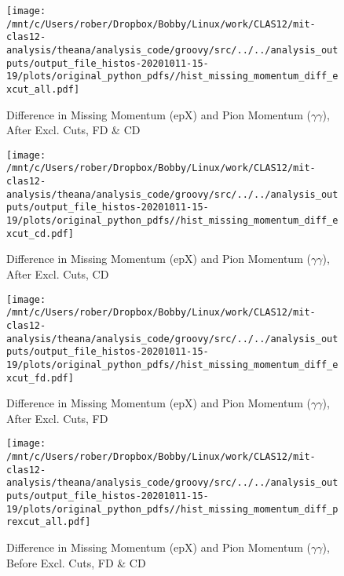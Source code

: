 \documentclass{article}
\begin{document}
\begin{landscape}
\begin{figure}[h]
        \texttt{[image: /mnt/c/Users/rober/Dropbox/Bobby/Linux/work/CLAS12/mit-clas12-analysis/theana/analysis\_code/groovy/src/../../analysis\_outputs/output\_file\_histos-20201011-15-19/plots/original\_python\_pdfs//hist\_missing\_momentum\_diff\_excut\_all.pdf]}
        \captionsetup{textformat=empty,labelformat=blank}
        \caption{Difference in Missing Momentum (epX) and Pion Momentum ($\gamma$$\gamma$), After Excl. Cuts, FD \& CD}
    \end{figure}
    \clearpage
    
    \begin{figure}[h]
        \centering

        \texttt{[image: /mnt/c/Users/rober/Dropbox/Bobby/Linux/work/CLAS12/mit-clas12-analysis/theana/analysis\_code/groovy/src/../../analysis\_outputs/output\_file\_histos-20201011-15-19/plots/original\_python\_pdfs//hist\_missing\_momentum\_diff\_excut\_cd.pdf]}
        \captionsetup{textformat=empty,labelformat=blank}
        \caption{Difference in Missing Momentum (epX) and Pion Momentum ($\gamma$$\gamma$), After Excl. Cuts, CD}
    \end{figure}
    \clearpage
    
    \begin{figure}[h]
        \centering

        \texttt{[image: /mnt/c/Users/rober/Dropbox/Bobby/Linux/work/CLAS12/mit-clas12-analysis/theana/analysis\_code/groovy/src/../../analysis\_outputs/output\_file\_histos-20201011-15-19/plots/original\_python\_pdfs//hist\_missing\_momentum\_diff\_excut\_fd.pdf]}
        \captionsetup{textformat=empty,labelformat=blank}
        \caption{Difference in Missing Momentum (epX) and Pion Momentum ($\gamma$$\gamma$), After Excl. Cuts, FD}
    \end{figure}
    \clearpage
    
    \begin{figure}[h]
        \centering

        \texttt{[image: /mnt/c/Users/rober/Dropbox/Bobby/Linux/work/CLAS12/mit-clas12-analysis/theana/analysis\_code/groovy/src/../../analysis\_outputs/output\_file\_histos-20201011-15-19/plots/original\_python\_pdfs//hist\_missing\_momentum\_diff\_prexcut\_all.pdf]}
        \captionsetup{textformat=empty,labelformat=blank}
        \caption{Difference in Missing Momentum (epX) and Pion Momentum ($\gamma$$\gamma$), Before Excl. Cuts, FD \& CD}
    \end{figure}
    \clearpage
    
    \begin{figure}[h]
        \centering


\end{figure}
\end{landscape}
\end{document}

